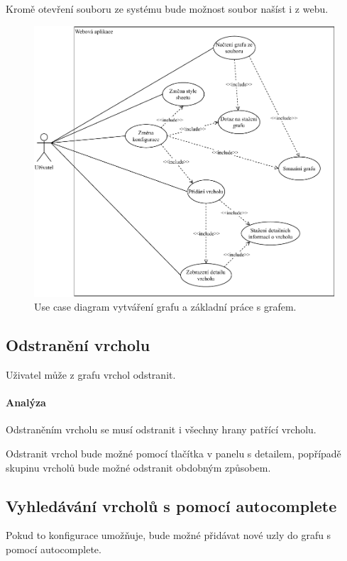 Kromě otevření souboru ze systému bude možnost soubor našíst i z webu.

\begin{figure}
    \centering
    \includegraphics[width=\textwidth]{media/use-case.pdf}
    \caption{Use case diagram vytváření grafu a základní práce s grafem.}
    \label{fig:use-case}
\end{figure}

\newpage

\subsection{Odstranění vrcholu}
Uživatel může z grafu vrchol odstranit.

\paragraph{Analýza} Odstraněním vrcholu se musí odstranit i všechny hrany patřící vrcholu.

Odstranit vrchol bude možné pomocí tlačítka v panelu s detailem, popřípadě skupinu vrcholů bude možné odstranit obdobným způsobem.

\subsection{Vyhledávání vrcholů s pomocí autocomplete}
Pokud to konfigurace umožňuje, bude možné přidávat nové uzly do grafu s pomocí autocomplete.

